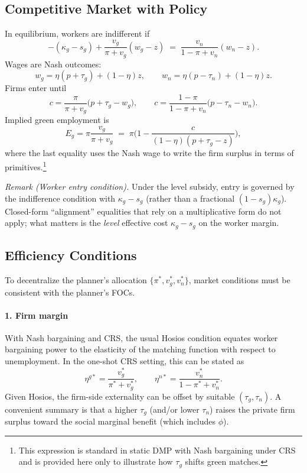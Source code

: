 \documentclass[preprint,12pt]{elsarticle}
\begin{document}
\subsection{Competitive Market with Policy}

In equilibrium, workers are indifferent if
\[
-(\kappa_g-s_g)+\frac{v_g}{\pi+v_g}(w_g-z)
\;=\;
\frac{v_n}{1-\pi+v_n}(w_n-z).
\]
Wages are Nash outcomes:
\[
w_g=\eta(p+\tau_g)+(1-\eta)z, 
\qquad
w_n=\eta(p-\tau_n)+(1-\eta)z.
\]
Firms enter until
\[
c=\frac{\pi}{\pi+v_g}\big(p+\tau_g-w_g\big), 
\qquad
c=\frac{1-\pi}{1-\pi+v_n}\big(p-\tau_n-w_n\big).
\]
Implied green employment is
\[
E_g=\pi\frac{v_g}{\pi+v_g} \;=\; \pi\Big(1-\frac{c}{(1-\eta)(p+\tau_g-z)}\Big),
\]
where the last equality uses the Nash wage to write the firm surplus in terms of primitives.\footnote{This expression is standard in static DMP with Nash bargaining under CRS and is provided here only to illustrate how \(\tau_g\) shifts green matches.}

\medskip
\noindent\emph{Remark (Worker entry condition).}  
Under the level subsidy, entry is governed by the indifference condition with \(\kappa_g-s_g\) (rather than a fractional \((1-s_g)\kappa_g\)). Closed-form “alignment” equalities that rely on a multiplicative form do not apply; what matters is the \emph{level} effective cost \(\kappa_g-s_g\) on the worker margin.

\subsection{Efficiency Conditions}

To decentralize the planner’s allocation \(\{\pi^*, v_g^*, v_n^*\}\), market conditions must be consistent with the planner’s FOCs.

\paragraph{1. Firm margin}  
With Nash bargaining and CRS, the usual Hosios condition equates worker bargaining power to the elasticity of the matching function with respect to unemployment. In the one-shot CRS setting, this can be stated as
\[
\eta^{g*}=\frac{v_g^*}{\pi^*+v_g^*}, 
\qquad 
\eta^{n*}=\frac{v_n^*}{1-\pi^*+v_n^*}.
\]
Given Hosios, the firm-side externality can be offset by suitable \((\tau_g,\tau_n)\). A convenient summary is that a higher \(\tau_g\) (and/or lower \(\tau_n\)) raises the private firm surplus toward the social marginal benefit (which includes \(\phi\)).
\end{document}
